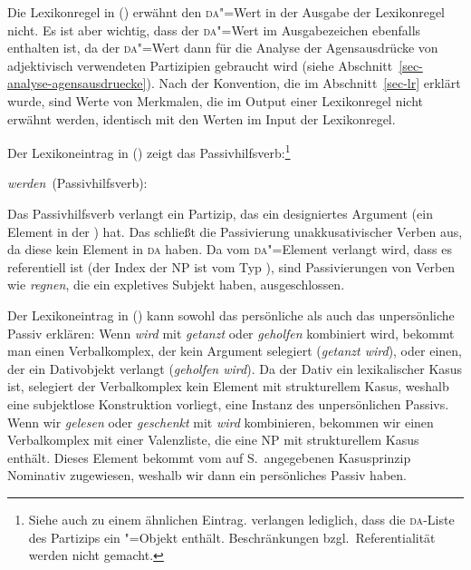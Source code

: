 Die Lexikonregel in () erwähnt den \textsc{da}"=Wert in der Ausgabe der Lexikonregel nicht. Es ist aber wichtig,
dass der \textsc{da}"=Wert im Ausgabezeichen ebenfalls enthalten ist, da der \textsc{da}"=Wert dann für die
Analyse der Agensausdrücke von adjektivisch verwendeten Partizipien gebraucht wird
(siehe Abschnitt~\ref{sec-analyse-agensausdruecke}). Nach der Konvention,
die im Abschnitt~\ref{sec-lr} erklärt wurde, sind Werte von Merkmalen, die im Output einer
Lexikonregel nicht erwähnt werden, identisch mit den Werten im Input der Lexikonregel.

Der Lexikoneintrag in () zeigt das Passivhilfsverb:\footnote{
  Siehe auch  zu einem ähnlichen Eintrag. \citeauthor{HM94a} verlangen
  lediglich, dass die \textsc{da}-Liste des Partizips ein "=Objekt enthält. Beschränkungen bzgl.\
  Referentialität werden nicht gemacht.%
}

\eas
\label{le-werden-passive-da}%
\mbox{\emph{werden} (Passivhilfsverb):}\\
\ms{
head$|$da & \eliste\\
arg-st    & \ibox{1} $\oplus$\ \sliste{ V[\type{ppp}, \textsc{lex}+, \textsc{da} \nliste{ \npref }, \textsc{comps} \ibox{1}] }\\
}
\zs

\noindent
Das Passivhilfsverb verlangt ein Partizip, das ein designiertes Argument (ein Element in der \daliste) hat.
Das schließt die Passivierung unakkusativischer Verben aus, da diese kein Element in \textsc{da} haben.
Da vom \textsc{da}"=Element verlangt wird, dass es referentiell ist (der Index der NP ist vom Typ
\type{ref}\istype{ref}), sind Passivierungen von Verben wie \emph{regnen}, die ein expletives Subjekt haben, ausgeschlossen.

Der Lexikoneintrag in () kann sowohl das persönliche als auch das unpersönliche Passiv
erklären: Wenn \emph{wird} mit \emph{getanzt} oder \emph{geholfen} kombiniert wird,
bekommt man einen Verbalkomplex, der kein Argument selegiert (\emph{getanzt wird}), 
oder einen, der ein Dativobjekt verlangt (\emph{geholfen wird}). Da der Dativ ein lexikalischer
Kasus ist, selegiert der Verbalkomplex kein Element mit strukturellem Kasus, weshalb eine
subjektlose Konstruktion vorliegt, \dash eine Instanz des unpersönlichen Passivs.
Wenn wir \emph{gelesen} oder \emph{geschenkt} mit \emph{wird} kombinieren, bekommen
wir einen Verbalkomplex mit einer Valenzliste, die eine NP mit strukturellem Kasus enthält.
Dieses Element bekommt vom auf S.\,\pageref{case-p} angegebenen Kasusprinzip
Nominativ zugewiesen, weshalb wir dann ein persönliches Passiv haben.

